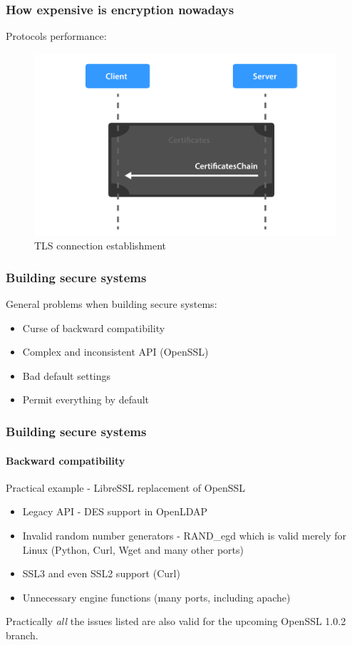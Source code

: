 \documentclass[11pt,t]{beamer}
\newcommand{\funcname}[1]{
	{\color{yellow!30} #1}
}
\newcommand{\cipher}[1]{
	{\color{blue!30} #1}
}
\begin{document}
\begin{frame}[fragile]
\frametitle{How expensive is encryption nowadays}
Protocols performance:
\begin{figure}[H]
\centering
\includegraphics[height=0.6\textheight]{tls.pdf}
\caption{TLS connection establishment}
\end{figure}
\end{frame}

\begin{frame}
\frametitle{Building secure systems}
General problems when building secure systems:
\begin{itemize}
\item<1-> Curse of backward compatibility
\item<2-> Complex and inconsistent API (OpenSSL)
\item<3-> Bad default settings
\item<3-> Permit everything by default
\end{itemize}
\end{frame}

\begin{frame}
\frametitle{Building secure systems}
\framesubtitle{Backward compatibility}
Practical example - LibreSSL replacement of OpenSSL
\begin{itemize}
\item Legacy API - \cipher{DES} support in OpenLDAP
\item Invalid random number generators - \funcname{RAND\_egd} which is valid merely for Linux (Python, Curl, Wget and many other ports)
\item SSL3 and even SSL2 support (Curl)
\item Unnecessary engine functions (many ports, including apache) 
\end{itemize}

Practically \textit{all} the issues listed are also valid for the upcoming OpenSSL 1.0.2 
branch.
\end{frame}
\end{document}
